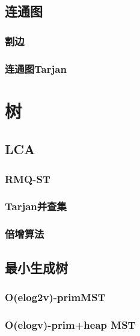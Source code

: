 \documentclass{ctexart}
\begin{document}
\subsection{连通图}
\subsubsection{割边}

\subsubsection{连通图Tarjan}




\section{树}
\subsection{LCA}
\subsubsection{RMQ-ST}

\subsubsection{Tarjan并查集}

\subsubsection{倍增算法}

\subsection{最小生成树}
\subsubsection{O(elog2v)-primMST}

\subsubsection{O(elogv)-prim+heap MST}

\end{document}
